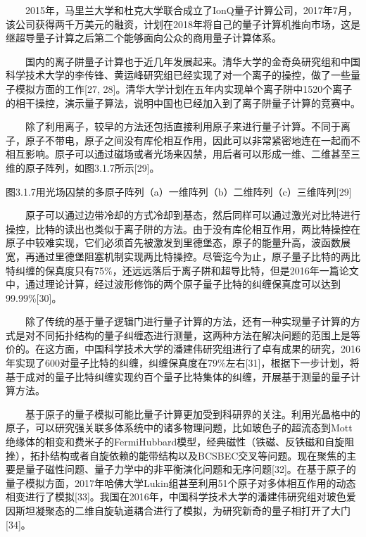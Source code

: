 \documentclass[a4paper,11pt,english]{sphinxmanual}
\begin{document}
\sphinxAtStartPar
  2015年，马里兰大学和杜克大学联合成立了IonQ量子计算公司，2017年7月，该公司获得两千万美元的融资，计划在2018年将自己的量子计算机推向市场，这是继超导量子计算之后第二个能够面向公众的商用量子计算体系。

\sphinxAtStartPar
  国内的离子阱量子计算也于近几年发展起来。清华大学的金奇奂研究组和中国科学技术大学的李传锋、黄运峰研究组已经实现了对一个离子的操控，做了一些量子模拟方面的工作{[}27, 28{]}。清华大学计划在五年内实现单个离子阱中15\sphinxhyphen{}20个离子的相干操控，演示量子算法，说明中国也已经加入到了离子阱量子计算的竞赛中。

\sphinxAtStartPar
{}

\sphinxAtStartPar
  除了利用离子，较早的方法还包括直接利用原子来进行量子计算。不同于离子，原子不带电，原子之间没有库伦相互作用，因此可以非常紧密地连在一起而不相互影响。原子可以通过磁场或者光场来囚禁，用后者可以形成一维、二维甚至三维的原子阵列，如图3.1.7所示{[}29{]}。


\begin{center}图3.1.7用光场囚禁的多原子阵列（a）一维阵列（b）二维阵列（c）三维阵列{[}29{]}
\end{center}
\sphinxAtStartPar
  原子可以通过边带冷却的方式冷却到基态，然后同样可以通过激光对比特进行操控，比特的读出也类似于离子阱的方法。由于没有库伦相互作用，两比特操控在原子中较难实现，它们必须首先被激发到里德堡态，原子的能量升高，波函数展宽，再通过里德堡阻塞机制实现两比特操控。尽管迄今为止，原子量子比特的两比特纠缠的保真度只有75\%，还远远落后于离子阱和超导比特，但是2016年一篇论文中，通过理论计算，经过波形修饰的两个原子量子比特的纠缠保真度可以达到99.99\%{[}30{]}。

\sphinxAtStartPar
  除了传统的基于量子逻辑门进行量子计算的方法，还有一种实现量子计算的方式是对不同拓扑结构的量子纠缠态进行测量，这两种方法在解决问题的范围上是等价的。在这方面，中国科学技术大学的潘建伟研究组进行了卓有成果的研究，2016年实现了600对量子比特的纠缠，纠缠保真度在79\%左右{[}31{]}，根据下一步计划，将基于成对的量子比特纠缠实现约百个量子比特集体的纠缠，开展基于测量的量子计算方法。

\sphinxAtStartPar
  基于原子的量子模拟可能比量子计算更加受到科研界的关注。利用光晶格中的原子，可以研究强关联多体系统中的诸多物理问题，比如玻色子的超流态到Mott绝缘体的相变和费米子的Fermi\sphinxhyphen{}Hubbard模型，经典磁性（铁磁、反铁磁和自旋阻挫），拓扑结构或者自旋依赖的能带结构以及BCS\sphinxhyphen{}BEC交叉等问题。现在聚焦的主要是量子磁性问题、量子力学中的非平衡演化问题和无序问题{[}32{]}。在基于原子的量子模拟方面，2017年哈佛大学Lukin组甚至利用51个原子对多体相互作用的动态相变进行了模拟{[}33{]}。我国在2016年，中国科学技术大学的潘建伟研究组对玻色\sphinxhyphen{}爱因斯坦凝聚态的二维自旋\sphinxhyphen{}轨道耦合进行了模拟，为研究新奇的量子相打开了大门{[}34{]}。
\end{document}

